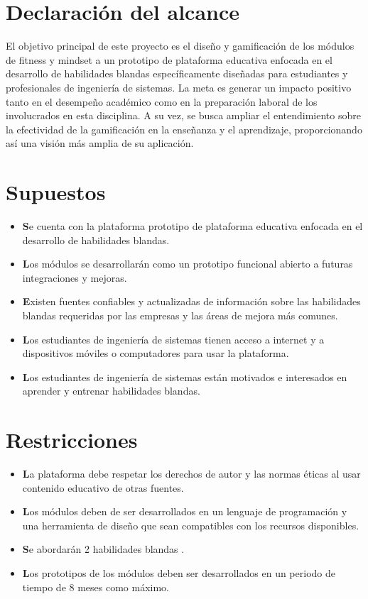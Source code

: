 \section{Declaración del alcance}
El objetivo principal de este proyecto es el diseño y gamificación de los módulos de fitness y mindset a un prototipo de plataforma educativa enfocada en el desarrollo de habilidades blandas específicamente diseñadas para estudiantes y profesionales de ingeniería de sistemas. La meta es generar un impacto positivo tanto en el desempeño académico como en la preparación laboral de los involucrados en esta disciplina. A su vez, se busca ampliar el entendimiento sobre la efectividad de la gamificación en la enseñanza y el aprendizaje, proporcionando así una visión más amplia de su aplicación.

\section{Supuestos}
\begin{itemize}
\item \textbf
Se cuenta con la plataforma prototipo de plataforma educativa enfocada en el desarrollo de habilidades blandas.
\item \textbf
Los módulos se desarrollarán como un prototipo funcional abierto a futuras integraciones y mejoras.
\item \textbf
Existen fuentes confiables y actualizadas de información sobre las habilidades blandas requeridas por las empresas y las áreas de mejora más comunes.
\item \textbf
Los estudiantes de ingeniería de sistemas tienen acceso a internet y a dispositivos móviles o computadores para usar la plataforma.
\item \textbf
Los estudiantes de ingeniería de sistemas están motivados e interesados en aprender y entrenar habilidades blandas.
\end{itemize}
\section{Restricciones}
\begin{itemize}
\item \textbf
La plataforma debe respetar los derechos de autor y las normas éticas al usar contenido educativo de otras fuentes.
\item \textbf
Los módulos deben de ser desarrollados en un lenguaje de programación y una herramienta de diseño que sean compatibles con los recursos disponibles.
\item \textbf
Se abordarán 2 habilidades blandas .
\item \textbf
Los prototipos de los módulos deben ser desarrollados en un periodo de tiempo de 8 meses como máximo.

\end{itemize}
